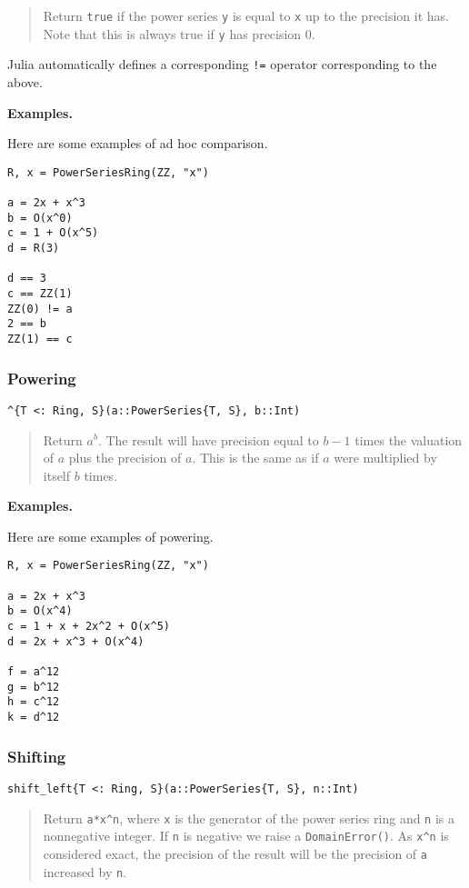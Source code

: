 \documentclass[a4paper,10pt]{article}
\newcommand{\code}{\lstinline}
\newcommand{\desc}[1]{\vspace{-3mm}\begin{quote}#1\end{quote}}
\begin{document}
{{\desc{Return \code{true} if the power series \code{y} is equal to \code{x} up
to the precision it has. Note that this is always true if \code{y} has
precision $0$.}

Julia automatically defines a corresponding \code{!=} operator corresponding to
the above.

\textbf{Examples.}

Here are some examples of ad hoc comparison.

\begin{lstlisting}
R, x = PowerSeriesRing(ZZ, "x")

a = 2x + x^3
b = O(x^0)
c = 1 + O(x^5)
d = R(3)

d == 3
c == ZZ(1)
ZZ(0) != a
2 == b
ZZ(1) == c
\end{lstlisting}

\subsubsection{Powering}

\begin{lstlisting}
^{T <: Ring, S}(a::PowerSeries{T, S}, b::Int)
\end{lstlisting}

\desc{Return $a^b$. The result will have precision equal to $b - 1$ times the
valuation of $a$ plus the precision of $a$. This is the same as if $a$ were
multiplied by itself $b$ times.}

\textbf{Examples.}

Here are some examples of powering.

\begin{lstlisting}
R, x = PowerSeriesRing(ZZ, "x")

a = 2x + x^3
b = O(x^4)
c = 1 + x + 2x^2 + O(x^5)
d = 2x + x^3 + O(x^4)

f = a^12
g = b^12
h = c^12
k = d^12
\end{lstlisting}

\subsubsection{Shifting}

\begin{lstlisting}
shift_left{T <: Ring, S}(a::PowerSeries{T, S}, n::Int)
\end{lstlisting}

\desc{Return \code{a*x^n}, where \code{x} is the generator of the power series
ring and \code{n} is a nonnegative integer. If \code{n} is negative we raise
a \code{DomainError()}. As \code{x^n} is considered exact, the precision of
the result will be the precision of \code{a} increased by \code{n}.}

}}
\end{document}
